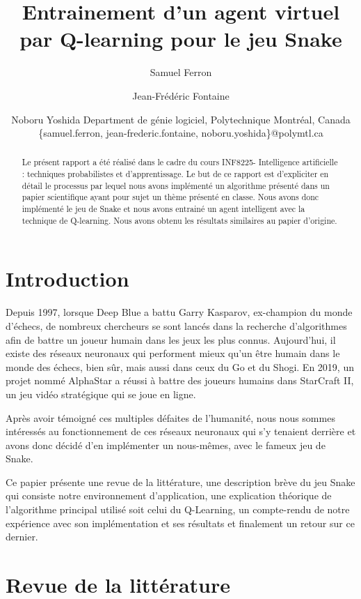 \documentclass{article}
\title{Entrainement d'un agent virtuel par Q-learning pour le jeu Snake}
\author{
Samuel Ferron\and
Jean-Frédéric Fontaine\and
Noboru Yoshida
\affiliations
Department de génie logiciel, Polytechnique Montréal, Canada\\
\emails
\{samuel.ferron, jean-frederic.fontaine, noboru.yoshida\}@polymtl.ca
}
\begin{document}
\maketitle

\begin{abstract}
Le présent rapport a été réalisé dans le cadre du cours INF8225- Intelligence artificielle : techniques probabilistes et d’apprentissage. Le but de ce rapport est d'expliciter en détail le processus par lequel nous avons implémenté un algorithme présenté dans un papier scientifique ayant pour sujet un thème présenté en classe. Nous avons donc implémenté le jeu de Snake et nous avons entrainé un agent intelligent avec la technique de Q-learning. Nous avons obtenu les résultats similaires au papier d'origine. 
\end{abstract}

\section{Introduction}

Depuis 1997, lorsque Deep Blue a battu Garry Kasparov, ex-champion du monde d’échecs, de nombreux chercheurs se sont lancés dans la recherche d’algorithmes afin de battre un joueur humain dans les jeux les plus connus. Aujourd’hui, il existe des réseaux neuronaux qui performent mieux qu’un être humain dans le monde des échecs, bien sûr, mais aussi dans ceux du Go et du Shogi. En 2019, un projet nommé AlphaStar a réussi à battre des joueurs humains dans StarCraft II, un jeu vidéo stratégique qui se joue en ligne.\linebreak

Après avoir témoigné ces multiples défaites de l’humanité, nous nous sommes intéressés au fonctionnement de ces réseaux neuronaux qui s’y tenaient derrière et avons donc décidé d’en implémenter un nous-mêmes, avec le fameux jeu de Snake.\linebreak

Ce papier présente une revue de la littérature, une description brève du jeu Snake qui consiste notre environnement d'application, une explication théorique de l'algorithme principal utilisé soit celui du Q-Learning, un compte-rendu de notre expérience avec son implémentation et ses résultats et finalement un retour sur ce dernier.

\section{Revue de la littérature}
 
\end{document}
